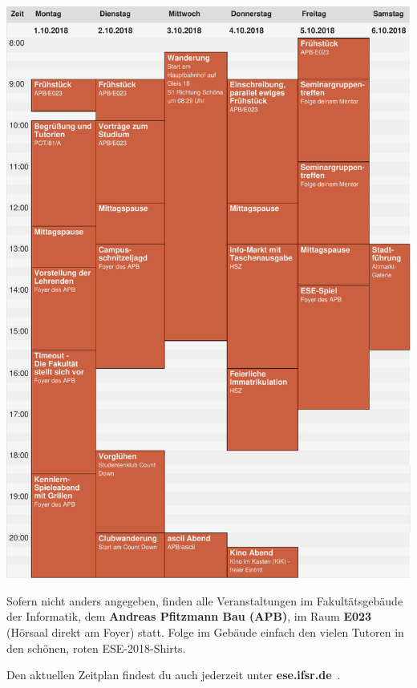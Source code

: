 \begin{center}
  \vspace*{-6.5em}
  \includegraphics[height=.77\dimen108,keepaspectratio]{img/zeitplan.pdf}%

  \small
  \vfill
  \enlargethispage{3em}

  Sofern nicht anders angegeben, finden alle Veranstaltungen im Fakultätsgebäude der Informatik, dem
  \textbf{Andreas Pfitzmann Bau (APB)}, im Raum \textbf{E023} (Hörsaal direkt am Foyer) statt.
  Folge im Gebäude einfach den vielen Tutoren in den schönen, roten ESE-2018-Shirts.

  Den aktuellen Zeitplan findest du auch jederzeit unter \textbf{ese.ifsr.de}~.
\end{center}
